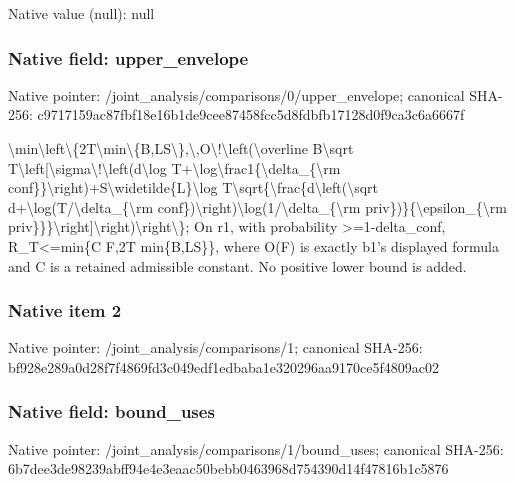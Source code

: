 \documentclass[10pt,a4paper]{article}
\begin{document}
Native value (null): null

\subsubsection{Native field: upper\_\allowbreak{}envelope}
Native pointer: /joint\_\allowbreak{}analysis/comparisons/0/upper\_\allowbreak{}envelope; canonical SHA-256: c9717159ac87fbf18e16b1de9cee87458fcc5d8fdbfb17128d0f9ca3c6a6667f

\begingroup\raggedright\sloppy \textbackslash{}min\textbackslash{}left\textbackslash{}\{2T\textbackslash{}min\textbackslash{}\{B,\allowbreak{}LS\textbackslash{}\},\allowbreak{}\textbackslash{},\allowbreak{}O\textbackslash{}!\textbackslash{}left(\textbackslash{}overline B\textbackslash{}sqrt T\textbackslash{}left[\textbackslash{}sigma\textbackslash{}!\textbackslash{}left(d\textbackslash{}log T+\textbackslash{}log\textbackslash{}frac1\{\textbackslash{}delta\_\allowbreak{}\{\textbackslash{}rm conf\}\}\textbackslash{}right)+S\textbackslash{}widetilde\{L\}\textbackslash{}log T\textbackslash{}sqrt\{\textbackslash{}frac\{d\textbackslash{}left(\textbackslash{}sqrt d+\textbackslash{}log(T/\allowbreak{}\textbackslash{}delta\_\allowbreak{}\{\textbackslash{}rm conf\})\textbackslash{}right)\textbackslash{}log(1/\allowbreak{}\textbackslash{}delta\_\allowbreak{}\{\textbackslash{}rm priv\})\}\{\textbackslash{}epsilon\_\allowbreak{}\{\textbackslash{}rm priv\}\}\}\textbackslash{}right]\textbackslash{}right)\textbackslash{}right\textbackslash{}\};\allowbreak{} On r1,\allowbreak{} with probability >=\allowbreak{}1-delta\_\allowbreak{}conf,\allowbreak{} R\_\allowbreak{}T<=\allowbreak{}min\{C F,\allowbreak{}2T min\{B,\allowbreak{}LS\}\},\allowbreak{} where O(F) is exactly b1's displayed formula and C is a retained admissible constant. No positive lower bound is added.\par\endgroup

\subsubsection{Native item 2}
Native pointer: /joint\_\allowbreak{}analysis/comparisons/1; canonical SHA-256: bf928e289a0d28f7f4869fd3c049edf1edbaba1e320296aa9170ce5f4809ac02

\subsubsection{Native field: bound\_\allowbreak{}uses}
Native pointer: /joint\_\allowbreak{}analysis/comparisons/1/bound\_\allowbreak{}uses; canonical SHA-256: 6b7dee3de98239abff94e4e3eaac50bebb0463968d754390d14f47816b1c5876
\end{document}

